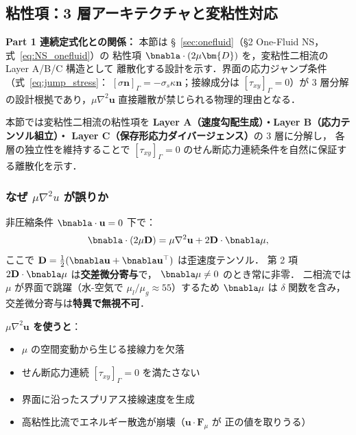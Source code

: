 %
%
\subsection{粘性項：3 層アーキテクチャと変粘性対応}
\label{sec:viscous_3layer}

\noindent\textbf{Part 1 連続定式化との関係：}
本節は §~\ref{sec:onefluid}（§2 One-Fluid NS，式~\eqref{eq:NS_onefluid}）の
粘性項 $\bnabla\cdot(2\mu\bm{D})$ を，変粘性二相流の Layer A/B/C 構造として
離散化する設計を示す．界面の応力ジャンプ条件（式~\eqref{eq:jump_stress}：
$[\sigma\bm{n}]_\Gamma = -\sigma_s\kappa\bm{n}$；接線成分は $[\tau_{xy}]_\Gamma=0$）が
3 層分解の設計根拠であり，$\mu\nabla^2\bm{u}$ 直接離散が禁じられる物理的理由となる．

本節では変粘性二相流の粘性項を
\textbf{Layer A（速度勾配生成）・Layer B（応力テンソル組立）・
Layer C（保存形応力ダイバージェンス）}の 3 層に分解し，
各層の独立性を維持することで
$[\tau_{xy}]_\Gamma=0$ のせん断応力連続条件を自然に保証する離散化を示す．

\subsubsection{なぜ $\mu\nabla^2 u$ が誤りか}
\label{sec:viscous_mu_lap_forbidden}

非圧縮条件 $\bnabla\cdot\mathbf{u}=0$ 下で：
\begin{equation}
  \bnabla\cdot(2\mu\mathbf{D})
  = \mu\nabla^2\mathbf{u} + 2\mathbf{D}\cdot\bnabla\mu,
  \label{eq:viscous_exact_decomposition}
\end{equation}
ここで $\mathbf{D} = \tfrac{1}{2}(\bnabla\mathbf{u} + \bnabla\mathbf{u}^\top)$
は歪速度テンソル．
第 2 項 $2\mathbf{D}\cdot\bnabla\mu$ は\textbf{交差微分寄与}で，
$\bnabla\mu\neq 0$ のとき常に非零．
二相流では $\mu$ が界面で跳躍（水-空気で $\mu_l/\mu_g\approx 55$）するため
$\bnabla\mu$ は $\delta$ 関数を含み，交差微分寄与は\textbf{特異で無視不可}．

\noindent\textbf{$\mu\nabla^2\mathbf{u}$ を使うと}：
\begin{itemize}
  \item $\mu$ の空間変動から生じる接線力を欠落
  \item せん断応力連続 $[\tau_{xy}]_\Gamma = 0$ を満たさない
  \item 界面に沿ったスプリアス接線速度を生成
  \item 高粘性比流でエネルギー散逸が崩壊（$\mathbf{u}\cdot\mathbf{F}_\mu$ が
        正の値を取りうる）
\end{itemize}

